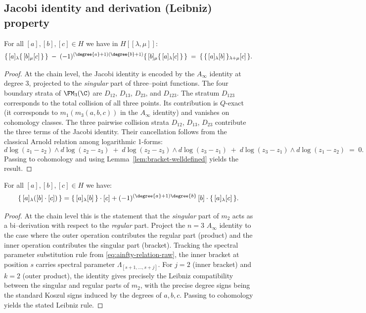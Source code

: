 \subsection{Jacobi identity and derivation (Leibniz) property}
\begin{theorem}%
For all $[a],[b],[c]\in H$ we have in $H[\![\lambda,\mu]\!]$:
\[
\{\, [a] {}_\lambda \{\, [b] {}_\mu [c] \,\} \,\} \;-\; (-1)^{(\degree{a}+1)(\degree{b}+1)} \{\, [b] {}_\mu \{\, [a] {}_\lambda [c] \,\} \,\} \;=\; \{\, \{\, [a] {}_\lambda [b] \,\} {}_{\lambda+\mu} [c] \,\}.
\]
\end{theorem}
\begin{proof}
At the chain level, the Jacobi identity is encoded by the $A_\infty$ identity at degree $3$, projected to the \emph{singular} part of three–point functions. The four boundary strata of $\FM_3(\C)$ are $D_{12}$, $D_{13}$, $D_{23}$, and $D_{123}$. The stratum $D_{123}$ corresponds to the total collision of all three points. Its contribution is $Q$-exact (it corresponds to $m_1(m_3(a,b,c))$ in the $A_\infty$ identity) and vanishes on cohomology classes. The three pairwise collision strata $D_{12}$, $D_{13}$, $D_{23}$ contribute the three terms of the Jacobi identity. Their cancellation follows from the classical Arnold relation among logarithmic 1-forms:
\[
 d\log(z_1-z_2) \wedge d\log(z_2-z_3) \;+\; d\log(z_2-z_3) \wedge d\log(z_3-z_1) \;+\; d\log(z_3-z_1) \wedge d\log(z_1-z_2) \;=\; 0.
\]
Passing to cohomology and using Lemma~\ref{lem:bracket-welldefined} yields the result.
\end{proof}
\begin{theorem}%
For all $[a],[b],[c]\in H$ we have:
\[
\{\, [a] {}_\lambda ([b]\cdot [c]) \,\} = \{\, [a] {}_\lambda [b] \,\}\cdot [c] + (-1)^{(\degree{a}+1)\degree{b}} \,[b]\cdot \{\, [a] {}_\lambda [c] \,\}.
\]
\end{theorem}
\begin{proof}
At the chain level this is the statement that the \emph{singular} part of $m_2$ acts as a bi–derivation with respect to the \emph{regular} part. Project the $n=3$ $A_\infty$ identity to the case where the outer operation contributes the regular part (product) and the inner operation contributes the singular part (bracket). Tracking the spectral parameter substitution rule from \eqref{eq:ainfty-relation-raw}, the inner bracket at position $s$ carries spectral parameter $\Lambda_{[s+1,\ldots,s+j]}$. For $j=2$ (inner bracket) and $k=2$ (outer product), the identity gives precisely the Leibniz compatibility between the singular and regular parts of $m_2$, with the precise degree signs being the standard Koszul signs induced by the degrees of $a,b,c$. Passing to cohomology yields the stated Leibniz rule.
\end{proof}

